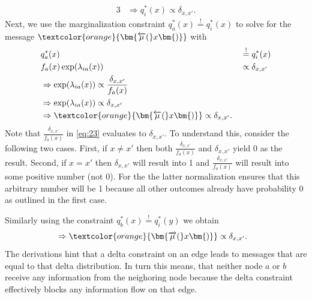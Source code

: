 \begin{alignat}{3}
     & \Rightarrow q_i^*(x) \propto \delta_{x,x'}.
\end{alignat}
Next, we use the marginalization constraint \(q_a^*(x) \overset{!}{=} q_i^*(x)\) to solve for the message \(\textcolor{orange}{\bm{\overleftarrow{\mu}(}x\bm{)}}\) with
\begin{alignat}{2}
     & q_a^*(x)                                                                                          &  & \overset{!}{=} q_i^*(x) \\
     & f_a(x) \exp(\lambda_{ia}(x))                                                                      &  & \propto \delta_{x,x'}   \\
     & \Rightarrow \exp(\lambda_{ia}(x))              \propto \frac{\delta_{x,x'}}{f_a(x)} \label{eq:23}                              \\
     & \Rightarrow \exp(\lambda_{ia}(x))              \propto \delta_{x,x'}                                                           \\
     & \Rightarrow \textcolor{orange}{\bm{\overleftarrow{\mu}(}x\bm{)}}  \propto \delta_{x,x'}.
\end{alignat}
Note that \(\frac{\delta_{x,x'}}{f_a(x)}\) in \cref{eq:23} evaluates to \(\delta_{x,x'}\). To understand this, consider the following two cases. First, if \(x \neq x'\) then both \(\frac{\delta_{x,x'}}{f_a(x)}\) and \(\delta_{x,x'}\) yield 0 as the result. Second, if \(x = x'\) then \(\delta_{x,x'}\) will result into 1 and  \(\frac{\delta_{x,x'}}{f_a(x)}\) will result into some positive number (not 0). For the the latter normalization ensures that this arbitrary number will be 1 because all other outcomes already have probability 0 as outlined in the first case.

Similarly using the constraint \(q_b^*(x) \overset{!}{=} q_i^*(y)\) we obtain
\begin{alignat}{2}
     & \Rightarrow \textcolor{orange}{\bm{\overrightarrow{\mu}(}x\bm{)}}  \propto \delta_{x,x'}.
\end{alignat}
The derivations hint that a delta constraint on an edge leads to messages that are equal to that delta distribution. In turn this means, that neither node \(a\) or \(b\) receive any information from the neighoring node because the delta constraint effectively blocks any information flow on that edge.

